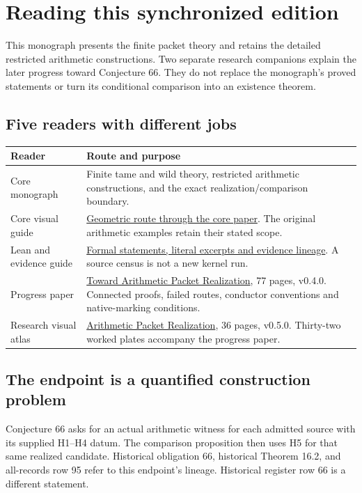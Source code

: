 \begingroup\raggedright
\section*{Reading this synchronized edition}
{}
This monograph presents the finite packet theory and retains the detailed restricted arithmetic constructions. Two separate research companions explain the later progress toward Conjecture 66. They do not replace the monograph's proved statements or turn its conditional comparison into an existence theorem.

\subsection*{Five readers with different jobs}
\begin{tabular}{@{}>{\raggedright\arraybackslash}p{.28\linewidth}>{\raggedright\arraybackslash}p{.67\linewidth}@{}}\toprule
Reader & Route and purpose\\\midrule
Core monograph & Finite tame and wild theory, restricted arithmetic constructions, and the exact realization/comparison boundary.\\[7pt]
Core visual guide & \href{https://komorebi.invalid/b06/core_visual}{Geometric route through the core paper}. The original arithmetic examples retain their stated scope.\\[7pt]
Lean and evidence guide & \href{https://komorebi.invalid/b06/core_lean}{Formal statements, literal excerpts and evidence lineage}. A source census is not a new kernel run.\\[7pt]
Progress paper & \href{https://komorebi.invalid/b06/research_start}{Toward Arithmetic Packet Realization}, 77 pages, v0.4.0. Connected proofs, failed routes, conductor conventions and native-marking conditions.\\[7pt]
Research visual atlas & \href{https://komorebi.invalid/b06/atlas_start}{Arithmetic Packet Realization}, 36 pages, v0.5.0. Thirty-two worked plates accompany the progress paper.\\\bottomrule
\end{tabular}

\subsection*{The endpoint is a quantified construction problem}
Conjecture 66 asks for an actual arithmetic witness for each admitted source with its supplied H1--H4 datum. The comparison proposition then uses H5 for that same realized candidate. Historical obligation 66, historical Theorem 16.2, and all-records row 95 refer to this endpoint's lineage. Historical register row 66 is a different statement.

